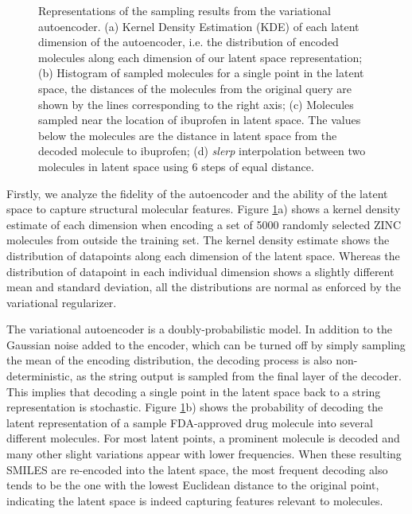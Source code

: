\begin{figure}
    \caption[Sampling the Latent Space of the Variational Autoencoder]{Representations of the sampling results from the variational autoencoder. (a) Kernel Density Estimation (KDE) of each latent dimension of the autoencoder, i.e. the distribution of encoded molecules along each dimension of our latent space representation; (b) Histogram of sampled molecules for a single point in the latent space, the distances of the molecules from the original query are shown by the lines corresponding to the right axis; (c) Molecules sampled near the location of ibuprofen in latent space. The values below the molecules are the distance in latent space from the decoded molecule to ibuprofen; (d) \textit{slerp} interpolation between two molecules in latent space using 6 steps of equal distance.}
    \label{fig:interpolation_figures}
\end{figure}



Firstly, we analyze the fidelity of the autoencoder and the ability of the latent space to capture structural molecular features.
Figure \ref{fig:interpolation_figures}a) shows a kernel density estimate of each dimension when encoding a set of 5000 randomly selected ZINC molecules from outside the training set. The kernel density estimate shows the distribution of datapoints along each dimension of the latent space.
 Whereas the distribution of datapoint in each individual dimension shows a slightly different mean and standard deviation, all the distributions are normal as enforced by the variational regularizer.

The variational autoencoder is a doubly-probabilistic model. In addition to the Gaussian noise added to the encoder, which can be turned off by simply sampling the mean of the encoding distribution, the decoding process is also non-deterministic, as the string output is sampled from the final layer of the decoder.
This implies that decoding a single point in the latent space back to a string representation is stochastic. Figure \ref{fig:interpolation_figures}b) shows the probability of decoding the latent representation of a sample FDA-approved drug molecule into several different molecules. For most latent points, a prominent molecule is decoded and many other slight variations appear with lower frequencies. When these resulting SMILES are re-encoded into the latent space, the most frequent decoding also tends to be the one with the lowest Euclidean distance to the original point, indicating the latent space is indeed capturing features relevant to molecules.

